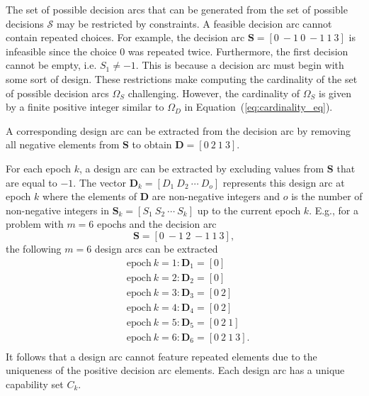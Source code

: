 The set of possible decision arcs that can be generated from the set of possible decisions $\mathcal{S}$ may be restricted by constraints. A feasible decision arc cannot contain repeated choices. For example, the decision arc $\mathbf{S} = \left[0 ~ -1 ~ 0 ~ -1 ~ 1 ~ 3\right]$ is infeasible since the choice $0$ was repeated twice. Furthermore, the first decision cannot be empty, i.e. $S_1 \neq -1$. This is because a decision arc must begin with some sort of design. These restrictions make computing the cardinality of the set of possible decision arcs $\Omega_S$ challenging. However, the cardinality of $\Omega_S$ is given by a finite positive integer similar to $\Omega_D$ in Equation~(\ref{eq:cardinality_eq}).

A corresponding design arc can be extracted from the decision arc by removing all negative elements from $\mathbf{S}$ to obtain $\mathbf{D} = \left[0 ~ 2 ~ 1 ~ 3\right]$. 

For each epoch $k$, a design arc can be extracted by excluding values from $\mathbf{S}$ that are equal to $-1$. The vector $\mathbf{D}_k = \left[D_1 ~ D_2 ~ \cdots ~ D_o\right]$ represents this design arc at epoch $k$ where the elements of $\mathbf{D}$ are non-negative integers and $o$ is the number of non-negative integers in $\mathbf{S}_k = \left[S_1 ~ S_2 ~ \cdots ~ S_k\right]$ up to the current epoch $k$. E.g., for a problem with $m=6$ epochs and the decision arc
%
\begin{equation*} \label{eq:decisionarcex}
	\mathbf{S} = \left[0 ~ -1 ~ 2 ~ -1 ~ 1 ~ 3\right],
\end{equation*}
%
the following $m=6$ design arcs can be extracted 
%
\begin{equation*}
	\begin{aligned}
		& \mathrm{epoch~} k=1: \mathbf{D}_1 = \left[0\right]\\
		& \mathrm{epoch~} k=2: \mathbf{D}_2 = \left[0\right]\\
		& \mathrm{epoch~} k=3: \mathbf{D}_3 = \left[0 ~ 2\right]\\
		& \mathrm{epoch~} k=4: \mathbf{D}_4 = \left[0 ~ 2\right]\\
		& \mathrm{epoch~} k=5: \mathbf{D}_5 = \left[0 ~ 2 ~ 1\right]\\
		& \mathrm{epoch~} k=6: \mathbf{D}_6 = \left[0 ~ 2 ~ 1 ~ 3\right].\\
	\end{aligned}
\end{equation*}
%
It follows that a design arc cannot feature repeated elements due to the uniqueness of the positive decision arc elements. Each design arc has a unique capability set $C_k$.

